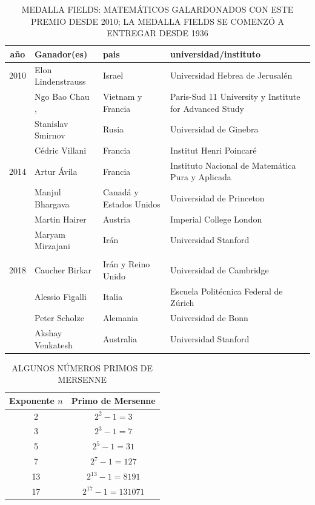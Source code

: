 
\begin{table}%
\caption{\MakeUppercase{Medalla Fields: matemáticos galardonados con este premio desde 2010; la medalla Fields se comenzó a entregar desde 1936}}
\begin{center}
\begin{tabular}{cp{4cm}p{2.5cm}p{6cm}}
    \hline
    año & Ganador(es) & pais & universidad/instituto\\
    \hline 
        2010 & Elon Lindenstrauss & Israel & Universidad Hebrea de Jerusalén\\
         & Ngo Bao Chau ,  & Vietnam y Francia &Paris-Sud 11 University y Institute for Advanced Study \\
         & Stanislav Smirnov  & Rusia & Universidad de Ginebra\\
         & Cédric Villani & Francia & Institut Henri Poincaré\\
         \hline
         2014 & Artur Ávila  & Francia &Instituto Nacional de Matemática Pura y Aplicada \\
         & Manjul Bhargava  &  Canadá y Estados Unidos &Universidad de Princeton \\
         & Martin Hairer & Austria & Imperial College London\\
         & Maryam Mirzajani & Irán &Universidad Stanford \\
         \hline\\
         2018	 & Caucher Birkar & Irán y Reino Unido & Universidad de Cambridge \\
         & Alessio Figalli & Italia & Escuela Politécnica Federal de Zúrich \\
         & Peter Scholze & Alemania & Universidad de Bonn\\
         & Akshay Venkatesh  & Australia & Universidad Stanford\\
        \hline
\end{tabular}
\end{center}
\label{table:medalla_fields}
\end{table}

\clearpage

\begin{table}%
\caption{\MakeUppercase{Algunos números primos de Mersenne}}
\begin{center}
\begin{tabular}{ c|c}
    \hline
    Exponente $n$ & Primo de Mersenne \\ \hline
    2 &  $2^{2}-1=3 $ \\ \hline
    3 &  $2^{3}-1=7 $ \\ \hline
    5 &  $2^{5}-1=31 $ \\ \hline
    7 &  $2^{7}-1=127 $ \\ \hline
    13 &  $2^{13}-1=8191 $ \\ \hline
    17 &  $2^{17}-1=131071 $ \\
        \hline
\end{tabular}
\end{center}
\label{table:num_mersenne}
\end{table}


